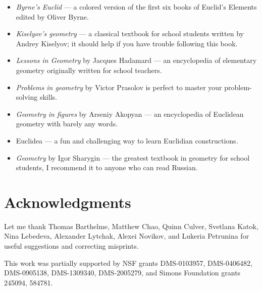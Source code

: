 \begin{itemize}
\item \emph{Byrne's Euclid} \cite{byrne} --- a colored version of the first six books of Euclid's Elements edited by Oliver Byrne. 

\item \emph{Kiselyov's geometry} \cite{kiselev} ---
a classical textbook for school students written by Andrey Kiselyov; it should help if you have trouble following this book.

\item \emph{Lessons in Geometry} by Jacques Hadamard \cite{hadamard} --- an encyclopedia of elementary geometry originally written for school teachers.



\item \emph{Problems in geometry} by Victor Prasolov\cite{prasolov}  is perfect to master your problem-solving skills.

\item \emph{Geometry in figures} by Arseniy Akopyan \cite{akopyan} --- an encyclopedia of Euclidean geometry with barely any words.

\item Euclidea \cite{euclidea} --- a fun and challenging way to learn Euclidian constructions.
 
\item \emph{Geometry} by Igor Sharygin \cite{sharygin} --- the greatest textbook in geometry for school students, I recommend it to anyone who can read Russian.

\end{itemize}

\section{Acknowledgments}

{\sloppy

Let me thank 
Thomas Barthelme,
Matthew Chao, 
Quinn Culver,
Svetlana Katok, 
Nina Lebedeva,
Alexander Lytchak,
Alexei Novikov,
and Lukeria Petrunina
for useful suggestions and correcting misprints.

This work was partially supported by
NSF grants
DMS-0103957,
DMS-0406482,
DMS-0905138,
DMS-1309340,
DMS-2005279,
and Simons Foundation grants 
245094, 584781.

}
